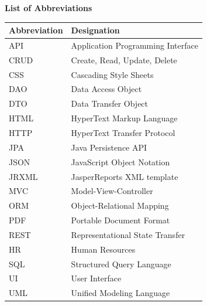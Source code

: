 \documentclass[a4paper,12pt]{report}
\begin{document}
\newpage
{}
{}

\begin{center}
\vspace{9cm}
    \textbf{\huge{List of Abbreviations}}
\end{center}
\vspace{1cm}

\begin{doublespace}
\begin{center}
\begin{tabular}{|l|l|}
  \hline
  Abbreviation &  Designation \\
  \hline
  API & Application Programming Interface \\
  \hline
  CRUD & Create, Read, Update, Delete \\
  \hline
  CSS & Cascading Style Sheets \\
  \hline
  DAO & Data Access Object \\
  \hline
  DTO & Data Transfer Object \\
  \hline
  HTML & HyperText Markup Language \\
  \hline
  HTTP & HyperText Transfer Protocol \\
  \hline
  JPA & Java Persistence API \\
  \hline
  JSON & JavaScript Object Notation \\
  \hline
  JRXML & JasperReports XML template \\
  \hline
  MVC & Model-View-Controller \\
  \hline
  ORM & Object-Relational Mapping \\
  \hline
  PDF & Portable Document Format \\
  \hline
  REST & Representational State Transfer \\
  \hline
  HR & Human Resources \\
  \hline
  SQL & Structured Query Language \\
  \hline
  UI & User Interface \\
  \hline
  UML & Unified Modeling Language \\
  \hline
\end{tabular}
\end{center}
\end{doublespace}

\newpage
\renewcommand{\contentsname}{Table of Contents}
\setcounter{tocdepth}{3}
\tableofcontents
\end{document}
